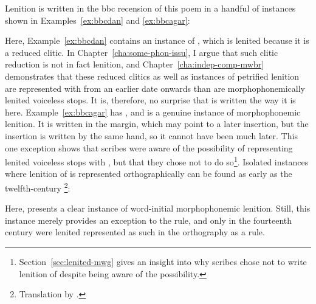 Lenition is written in the \gls{bbc} recension of this poem in a handful of instances shown in Examples~\ref{ex:bbcdan} and \ref{ex:bbcagar}:
\begin{mwl}
\end{mwl}
Here, Example~\ref{ex:bbcdan} contains an instance of , which is lenited because it is a reduced clitic. In Chapter~\ref{cha:some-phon-issu}, I argue that such clitic reduction is not in fact lenition, and Chapter~\ref{cha:indep-comp-mwbr} demonstrates that these reduced clitics as well as instances of petrified lenition are represented with  from an earlier date onwards than are morphophonemically lenited voiceless stops. It is, therefore, no surprise that  is written the way it is here. Example~\ref{ex:bbcagar} has , and is a genuine instance of morphophonemic lenition. It is written in the margin, which may point to a later insertion, but the insertion is written by the same hand, so it cannot have been much later. This one exception shows that scribes were aware of the possibility of representing lenited voiceless stops with , but that they chose not to do so\footnote{Section~\ref{sec:lenited-mwg} gives an insight into why scribes chose not to write lenition of  despite being aware of the possibility.}. Isolated instances where lenition of  is represented orthographically can be found as early as the twelfth-century \footnote{Translation by \textcite[136]{davies_braint_1974}.}:
\begin{mwl}
\end{mwl}
Here,   presents a clear instance of word-initial morphophonemic lenition. Still, this instance merely  provides an exception to the rule, and only in the fourteenth century  were lenited   represented as such in the orthography as a rule.

